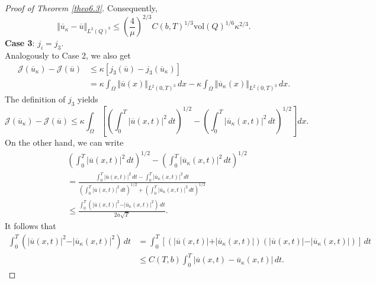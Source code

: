 \documentclass[10pt,a4paper]{amsart}
\begin{document}
\begin{proof}[Proof of Theorem \ref{theo6.3}]
		Consequently,
		\begin{equation} \label{sta_j2}
			\Vert \overline{u}_{\kappa} - \overline{u} \Vert_{L^2(Q)^3} \leq \left(\frac{4}{\mu}\right)^{2/3}C(b,T)^{1/3} \text{vol}(Q)^{1/6} \kappa^{2/3}.
		\end{equation}
		\textbf{Case 3}: $j_i=j_3$.\\
		Analogously to Case 2, we also get
		\begin{equation} \label{6.3.6}
			\begin{aligned}
				\mathcal{J}({\overline{u}}_{\kappa}) - \mathcal{J}(\overline{u}) &\leq \kappa \left[ j_3(\overline{u}) - j_3 (\overline{u}_{\kappa}) \right] \\
				&= \kappa\int_\Omega \Vert \overline{u}(x) \Vert_{L^2(0,T)^3}\, dx - \kappa \int_\Omega \Vert \overline{u}_{\kappa} (x)\Vert_{L^2(0,T)^3} \, dx.
			\end{aligned}
		\end{equation}
		The definition of $j_3$ yields
		\begin{equation*}
			\mathcal{J}({\overline{u}}_{\kappa}) - \mathcal{J}(\overline{u}) \leq \kappa \int_\Omega\left[ \left( \int_0^T \vert \overline{u}(x,t) \vert^2 \, dt\right)^{1/2} - \left( \int_0^T \vert \overline{u}_{\kappa}(x,t) \vert^2 \, dt\right)^{1/2} \right]dx.
		\end{equation*}
		On the other hand, we can write
		\begin{align*} 
			&\left( \int_0^T \vert \overline{u}(x,t) \vert^2 \, dt\right)^{1/2} - \left( \int_0^T \vert \overline{u}_{\kappa}(x,t) \vert^2 \, dt\right)^{1/2} \\&= \displaystyle \frac{\int_0^T \vert \overline{u}(x,t) \vert^2 \, dt - \int_0^T \vert \overline{u}_{\kappa}(x,t) \vert^2 \, dt }{\left( \int_0^T \vert \overline{u}(x,t) \vert^2 \, dt\right)^{1/2} + \left( \int_0^T \vert \overline{u}_{\kappa}(x,t) \vert^2 \, dt\right)^{1/2}} \\
			&\leq \frac{\int_0^T (\vert \overline{u}(x,t) \vert^2 - \vert\overline{u}_{\kappa}(x,t)\vert^2) \, dt}{2a\sqrt{T}}.
		\end{align*}
		It follows that
		\begin{align*}
			\int_0^T \left( \vert \overline{u}(x,t) \vert^2 - \vert\overline{u}_{\kappa}(x,t)\vert^2 \right) \, dt &= \int_0^T \left[ (\vert \overline{u}(x,t)\vert+\vert \overline{u}_{\kappa}(x,t)\vert)(\vert \overline{u}(x,t)\vert-\vert \overline{u}_{\kappa}(x,t)\vert) \right] \, dt \\
			&\leq C(T,b)\int_0^T \vert \overline{u}(x,t) - \overline{u}_{\kappa}(x,t) \vert \, dt.

\end{align*}
\end{proof}
\end{document}
